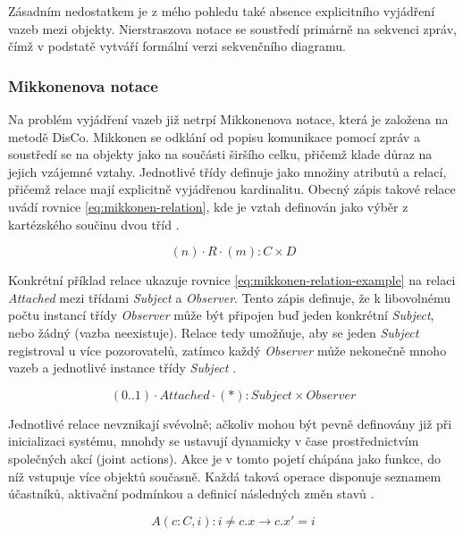 \documentclass[FM,DP,fonts]{tulthesis}
\begin{document}
Zásadním nedostatkem je z mého pohledu také absence explicitního vyjádření vazeb mezi objekty. Nierstraszova notace se soustředí primárně na sekvenci zpráv, čímž v podstatě vytváří formální verzi sekvenčního diagramu.

\subsubsection{Mikkonenova notace}
Na problém vyjádření vazeb již netrpí Mikkonenova notace, která je založena na metodě DisCo. Mikkonen se odklání od popisu komunikace pomocí zpráv a soustředí se na objekty jako na součásti širšího celku, přičemž klade důraz na jejich vzájemné vztahy. Jednotlivé třídy definuje jako množiny atributů a relací, přičemž relace mají explicitně vyjádřenou kardinalitu. Obecný zápis takové relace uvádí rovnice \ref{eq:mikkonen-relation}, kde je vztah definován jako výběr z kartézského součinu dvou tříd \parencite{mikkonen-formalizing-patterns}.

\begin{equation}\label{eq:mikkonen-relation}
	(n) \cdot R \cdot (m) : C \times D
\end{equation}

Konkrétní příklad relace ukazuje rovnice \ref{eq:mikkonen-relation-example} na relaci \textit{Attached} mezi třídami \textit{Subject} a \textit{Observer}. Tento zápis definuje, že k libovolnému počtu instancí třídy \textit{Observer} může být připojen buď jeden konkrétní \textit{Subject}, nebo žádný (vazba neexistuje). Relace tedy umožňuje, aby se jeden \textit{Subject} registroval u více pozorovatelů, zatímco každý \textit{Observer} může nekonečně mnoho vazeb a jednotlivé instance třídy \textit{Subject} \parencite{mikkonen-formalizing-patterns}.

\begin{equation}\label{eq:mikkonen-relation-example}
	(0..1) \cdot Attached \cdot (*) : Subject \times Observer
\end{equation}

Jednotlivé relace nevznikají svévolně; ačkoliv mohou být pevně definovány již při inicializaci systému, mnohdy se ustavují dynamicky v čase prostřednictvím společných akcí (joint actions). Akce je v tomto pojetí chápána jako funkce, do níž vstupuje více objektů současně. Každá taková operace disponuje seznamem účastníků, aktivační podmínkou a definicí následných změn stavů \parencite{mikkonen-formalizing-patterns}.

\begin{equation}\label{eq:mikkonen-actions}
	A(c:C, i): i \neq c.x \rightarrow c.x' = i
\end{equation}
\end{document}
